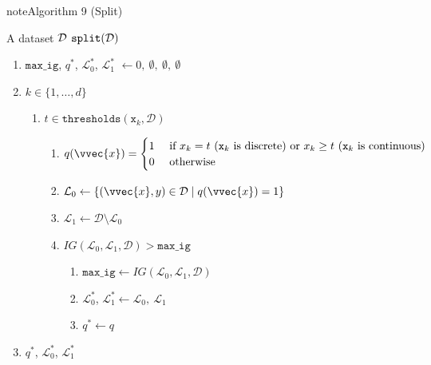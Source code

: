 \documentclass[letterpaper,10pt,english]{jupyterBook}
\begin{document}
\begin{sphinxadmonition}{note}{Algorithm 9 (Split)}



\sphinxAtStartPar
{} A dataset \({\cal D}\) \(\mathtt{split}({\cal D})\)
\begin{enumerate}
%
\item {} 
\sphinxAtStartPar
\(\mathtt{max\_ig}\), \(q^*\), \(\mathcal{L}_0^*\), \(\mathcal{L}_1^*\) \(\leftarrow 0,\ \emptyset,\ \emptyset,\ \emptyset\)

\item {} 
\sphinxAtStartPar
{} \(k\in\{1,\ldots, d\}\)
\begin{enumerate}
%
\item {} 
\sphinxAtStartPar
{} \(t\in\mathtt{thresholds}(\mathtt{x}_k, \mathcal{D})\)
\begin{enumerate}
%
\item {} 
\sphinxAtStartPar
\(q(\vvec{x})=\begin{cases}1& \text{ if } x_k= t\ (\mathtt{x}_k \text{ is discrete) or } x_k\geq t\ (\mathtt{x}_k \text{ is continuous})\\0& \text{ otherwise}\end{cases}\)

\item {} 
\sphinxAtStartPar
\(\mathcal{L}_0\leftarrow \{(\vvec{x},y)\in\mathcal{D}\mid q(\vvec{x})=1\}\)

\item {} 
\sphinxAtStartPar
\(\mathcal{L}_1\leftarrow \mathcal{D}\setminus \mathcal{L}_0\)

\item {} 
\sphinxAtStartPar
{} \(IG(\mathcal{L}_0,\mathcal{L}_1,\mathcal{D})>\mathtt{max\_ig}\)
\begin{enumerate}
%
\item {} 
\sphinxAtStartPar
\(\mathtt{max\_ig}\leftarrow IG(\mathcal{L}_0,\mathcal{L}_1,\mathcal{D})\)

\item {} 
\sphinxAtStartPar
\(\mathcal{L}_0^*\), \(\mathcal{L}_1^*\leftarrow \mathcal{L}_0,\ \mathcal{L}_1\)

\item {} 
\sphinxAtStartPar
\(q^*\gets q\)

\end{enumerate}

\end{enumerate}

\end{enumerate}

\item {} 
\sphinxAtStartPar
{} \(q^*\), \(\mathcal{L}_0^*\), \(\mathcal{L}_1^*\)

\end{enumerate}
\end{sphinxadmonition}
\end{document}
